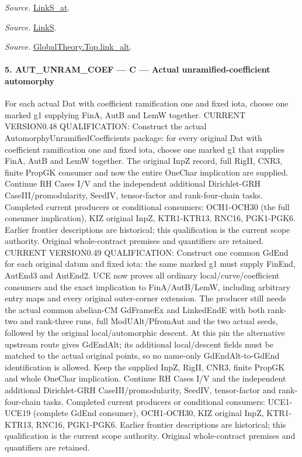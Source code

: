 \documentclass[11pt,a4paper]{article}
\numberwithin{equation}{section}
\theoremstyle{remark}\newtheorem{remark}[theorem]{Remark}
\begin{document}
\emph{Source.} \href{https://github.com/CocoSgt/riemann-hypothesis-lean/blob/7cbf7a0c32fca1badf05931879a37c3f8a2b03b4/src/Formalism/SharpRestriction/GlobalTheoremInputs.lean#L145-L149}{LinkS\_\allowbreak at}.

\emph{Source.} \href{https://github.com/CocoSgt/riemann-hypothesis-lean/blob/7cbf7a0c32fca1badf05931879a37c3f8a2b03b4/src/Formalism/SharpRestriction/GlobalTheoremInputs.lean#L152-L157}{LinkS}.

\emph{Source.} \href{https://github.com/CocoSgt/riemann-hypothesis-lean/blob/7cbf7a0c32fca1badf05931879a37c3f8a2b03b4/src/Development/AbelianVarietyTheory/Proofs/GlobalInterpolation/LinkAlt.lean#L16-L50}{GlobalTheory.Top.link\_\allowbreak alt}.



\paragraph{5. AUT\_\allowbreak UNRAM\_\allowbreak COEF — C — Actual unramified-coefficient automorphy}

For each actual Dat with coefficient ramification one and fixed iota, choose one marked g1 supplying FinA, AutB and LemW together. CURRENT VERSION0.48 QUALIFICATION: Construct the actual AutomorphyUnramifiedCoefficients package: for every original Dat with coefficient ramification one and fixed iota, choose one marked g1 that supplies FinA, AutB and LemW together. The original InpZ record, full RigII, CNR3, finite PropGK consumer and now the entire OneChar implication are supplied. Continue RH Cases I/V and the independent additional Dirichlet-GRH CaseIII/promodularity, SeedIV, tensor-factor and rank-four-chain tasks. Completed current producers or conditional consumers: OCH1-OCH30 (the full consumer implication), KIZ original InpZ, KTR1-KTR13, RNC16, PGK1-PGK6. Earlier frontier descriptions are historical; this qualification is the current scope authority. Original whole-contract premises and quantifiers are retained. CURRENT VERSION0.49 QUALIFICATION: Construct one common GdEnd for each original datum and fixed iota: the same marked g1 must supply FinEnd, AutEnd3 and AutEnd2. UCE now proves all ordinary local/curve/coefficient consumers and the exact implication to FinA/AutB/LemW, including arbitrary entry maps and every original outer-corner extension. The producer still needs the actual common abelian-CM GdFrameEx and LinkedEndE with both rank-two and rank-three runs, full ModUAlt/PfromAut and the two actual seeds, followed by the original local/automorphic descent. At this pin the alternative upstream route gives GdEndAlt; its additional local/descent fields must be matched to the actual original points, so no name-only GdEndAlt-to-GdEnd identification is allowed. Keep the supplied InpZ, RigII, CNR3, finite PropGK and whole OneChar implication. Continue RH Cases I/V and the independent additional Dirichlet-GRH CaseIII/promodularity, SeedIV, tensor-factor and rank-four-chain tasks. Completed current producers or conditional consumers: UCE1-UCE19 (complete GdEnd consumer), OCH1-OCH30, KIZ original InpZ, KTR1-KTR13, RNC16, PGK1-PGK6. Earlier frontier descriptions are historical; this qualification is the current scope authority. Original whole-contract premises and quantifiers are retained.
\end{document}
